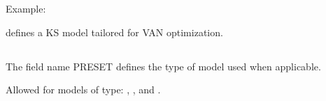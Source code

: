 \documentclass[letterpaper,10pt,english]{sphinxmanual}
\begin{document}
\begin{DUlineblock}{0em}
\item[] Example:
\item[]  defines a KS model tailored for VAN optimization.
\end{DUlineblock}


\subsection{}
\label{\detokenize{SgteLib:preset}}\label{\detokenize{SgteLib:id18}}
\begin{DUlineblock}{0em}
\item[] The field name PRESET defines the type of model used when applicable.
\item[] Allowed for models of type: {\hyperref[\detokenize{SgteLib:rbf}]{}}, {\hyperref[\detokenize{SgteLib:lowess}]{}}, {\hyperref[\detokenize{SgteLib:ensemble}]{}} and {\hyperref[\detokenize{SgteLib:ensemble-stat}]{}}.
\end{DUlineblock}
\end{document}
